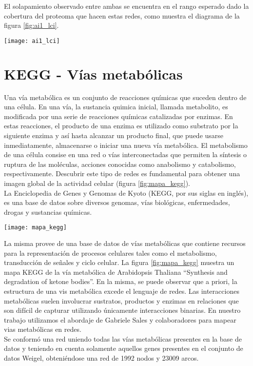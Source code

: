 El solapamiento observado entre ambas se encuentra en el rango esperado dado la cobertura del proteoma que hacen estas redes, como muestra el diagrama de la figura \ref{fig:ai1_lci}.
\begin{center}
\texttt{[image: ai1\_lci]}
\label{fig:ai1_lci}
\end{center}
\section{KEGG - Vías metabólicas}
\label{sec:kegg}
Una vía metabólica es un conjunto de reacciones químicas que suceden dentro de una célula. En una vía, la sustancia quimica inicial, llamada metabolito, es modificada por una serie de reacciones químicas catalizadas por enzimas. En estas reacciones, el producto de una enzima es utilizado como substrato por la siguiente enzima y así hasta alcanzar un producto final, que puede usarse inmediatamente, almacenarse o iniciar una nueva vía metabólica. El metabolismo de una célula consise en una red o vías interconectadas que permiten la síntesis o ruptura de las moléculas, acciones conocidas como anabolismo y catabolismo, respectivamente. Descubrir este tipo de redes es fundamental para obtener una imagen global de la actividad celular (figura \ref{fig:mapa_kegg}).\\
La Enciclopedia de Genes y Genomas de Kyoto (KEGG, por sus siglas en inglés), es una base de datos sobre diversos genomas, vías biológicas, enfermedades, drogas y sustancias químicas.
\begin{center}
    \texttt{[image: mapa\_kegg]}
    \label{fig:mapa_kegg}
\end{center}
La misma provee de una base de datos de vías metabólicas que contiene recursos para la representación de procesos celulares tales como el metabolismo, transducción de señales y ciclo celular. La figura \ref{fig:mapa_kegg} muestra un mapa KEGG de la vía metabólica de Arabidopsis Thaliana ``Synthesis and degradation of ketone bodies''. En la misma, se puede observar que a priori, la estructura de una vis metabólica excede el lenguaje de redes. Las interacciones metabólicas suelen involucrar sustratos, productos y enzimas en relaciones que son difícil de capturar utilizando únicamente interacciones binarias. 
En nuestro trabajo utilizamos el abordaje de Gabriele Sales y colaboradores \cite{Graphite2015} para mapear vias metabólicas en redes.\\
Se conformó una red uniendo todas las vías metabólicas presentes en la base de datos y teniendo en cuenta solamente aquellos genes presentes en el conjunto de datos Weigel, obteniéndose una red de 1992 nodos y 23009 arcos.
\cite{Segal2003, Kanehisa2000}
